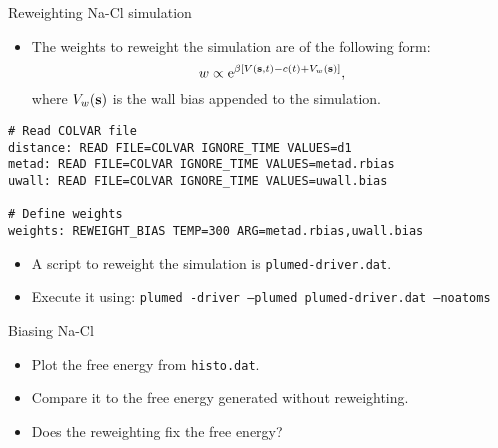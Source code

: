 \documentclass[10pt]{beamer}
\begin{document}
\begin{frame}[fragile]{Reweighting Na-Cl simulation}
\begin{itemize}
\setlength\itemsep{1em}
  \item The weights to reweight the simulation are of the following form:
  \begin{equation}
    w \propto \mathrm{e}^{\beta [V({\bf s},t)-c(t)+V_w({\bf s})]},
  \end{equation}
  where $V_w({\bf s})$ is the wall bias appended to the simulation.
\end{itemize}

\begin{lstlisting}
# Read COLVAR file
distance: READ FILE=COLVAR IGNORE_TIME VALUES=d1
metad: READ FILE=COLVAR IGNORE_TIME VALUES=metad.rbias
uwall: READ FILE=COLVAR IGNORE_TIME VALUES=uwall.bias

# Define weights
weights: REWEIGHT_BIAS TEMP=300 ARG=metad.rbias,uwall.bias
\end{lstlisting}

\begin{itemize}
\setlength\itemsep{1em}
  \item A script to reweight the simulation is \texttt{plumed-driver.dat}.
  \item Execute it using: \texttt{plumed -driver --plumed plumed-driver.dat --noatoms}
\end{itemize}
\end{frame}

\begin{frame}[fragile]{Biasing Na-Cl}
\begin{itemize}
\setlength\itemsep{1em}
  \item Plot the free energy from \texttt{histo.dat}.

  \item Compare it to the free energy generated without reweighting.

  \item Does the reweighting fix the free energy?
\end{itemize}
\end{frame}
\end{document}
